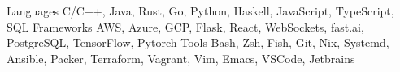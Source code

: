 
\begin{cvskills}
  \cvskill
    {Languages}
    {C/C++, Java, Rust, Go, Python, Haskell, JavaScript, TypeScript, SQL}
  \cvskill
    {Frameworks}
    {AWS, Azure, GCP, Flask, React, WebSockets, fast.ai, PostgreSQL, TensorFlow, Pytorch}
  \cvskill
    {Tools}
    {Bash, Zsh, Fish, Git, Nix, Systemd, Ansible, Packer, Terraform, Vagrant, Vim, Emacs, VSCode, Jetbrains}
\end{cvskills}
